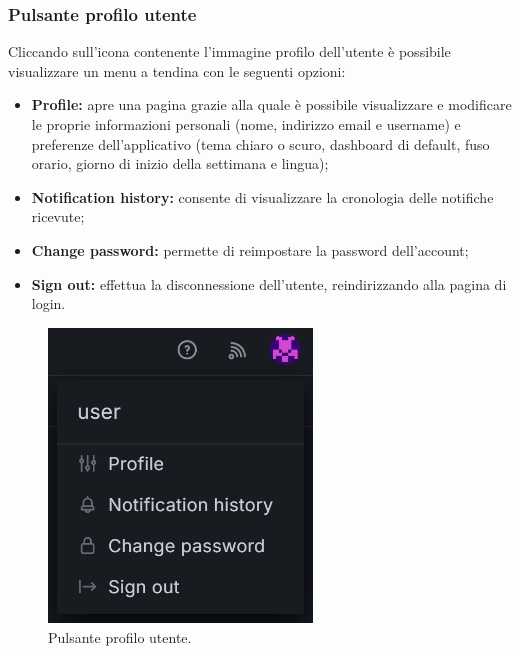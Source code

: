 \documentclass[8pt]{article}
\begin{document}
\subsubsection{Pulsante profilo utente}
Cliccando sull'icona contenente l'immagine profilo dell'utente è possibile visualizzare un menu a tendina con le seguenti opzioni:
\begin{itemize}
    \item \textbf{Profile:} apre una pagina grazie alla quale è possibile visualizzare e modificare le proprie informazioni personali (nome, indirizzo email e username) e preferenze dell'applicativo (tema chiaro o scuro, dashboard di default, fuso orario, giorno di inizio della settimana e lingua);
    \item \textbf{Notification history:} consente di visualizzare la cronologia delle notifiche ricevute;
    \item \textbf{Change password:} permette di reimpostare la password dell'account;
    \item \textbf{Sign out:} effettua la disconnessione dell'utente, reindirizzando alla pagina di login.
\end{itemize}
\begin{figure}[H]
    \centering
    \includegraphics[width=7cm]{images_mu/profile.png}
    \caption{Pulsante profilo utente.}
    \label{fig:Pulsante profilo utente}
\end{figure}
\end{document}
